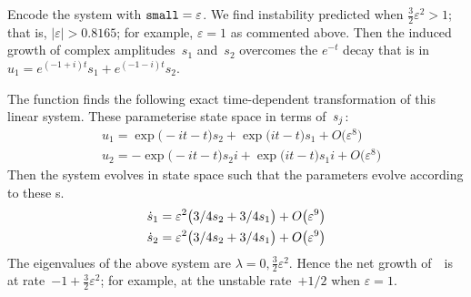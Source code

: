 Encode the system with \(\verb|small|=\varepsilon\).  We
find instability predicted when \(\tfrac32\varepsilon^2
>1\); that is, \(|\varepsilon|>0.8165\); for example,
\(\varepsilon=1\) as commented above.  Then the induced
growth of complex amplitudes~\(s_1\) and~\(s_2\) overcomes
the \(e^{-t}\) decay that is in \(u_1 = e^{(-1+i)t}s_1 +
e^{(-1-i)t}s_2\).
The function finds the following exact time-dependent
transformation of this linear system. These parameterise
state space in terms of~\(s\sb j\):
\begin{align*}&
u_{1}=\exp \big(-i t-t\big) s_{2}+\exp \big(i t-t\big) s_{1}+O\big(
\varepsilon ^{8}\big)
\\&
u_{2}=-\exp \big(-i t-t\big) s_{2} i+\exp \big(i t-t\big) s_{1} i+O\big(
\varepsilon ^{8}\big)
\end{align*}
Then the system evolves in state space such that the
parameters evolve according to these \ode{}s.
\begin{align*}&
\dot s_{1}=\varepsilon^{2} \big(3/4 s_{2}+3/4 s_{1}\big)+O\big(\varepsilon ^{9}
\big)
\\&
\dot s_{2}=\varepsilon^{2} \big(3/4 s_{2}+3/4 s_{1}\big)+O\big(\varepsilon ^{9}\big)
\end{align*}
The eigenvalues of the above system are \(\lambda =0,
\tfrac32\varepsilon^2\).  Hence the net growth of~\uv\ is at
rate~\(-1+\tfrac32\varepsilon^2\); for example, at the
unstable rate~\(+1/2\) when \(\varepsilon=1\).

